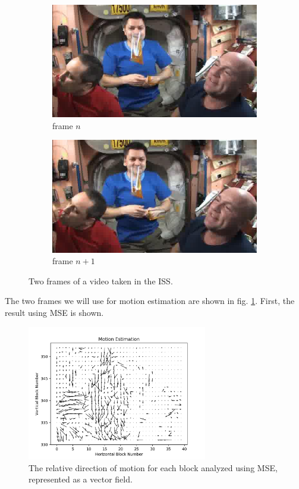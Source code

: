 \documentclass[11pt,a4paper]{article}
\begin{document}
\begin{figure}[ht]
	\centering
	\begin{subfigure}[h]{0.7\textwidth}
		\includegraphics[width=\textwidth]{xi01}
		\caption{frame $n$}
	\end{subfigure}
	\par\medskip
	\begin{subfigure}[h]{0.7\textwidth}
		\includegraphics[width=\textwidth]{xi02}
		\caption{frame $n+1$}
	\end{subfigure}
	\caption{Two frames of a video taken in the ISS.}
	\label{fig:two_frames}
\end{figure}

The two frames we will use for motion estimation are shown in fig. \ref{fig:two_frames}. First, the result using MSE is shown.

\begin{figure}[ht]
	\centering
	\includegraphics[width=0.7\textwidth]{vector_field}
	\caption{The relative direction of motion for each block analyzed using MSE, represented as a vector field.}
	\label{fig:vector}
\end{figure}
\end{document}
